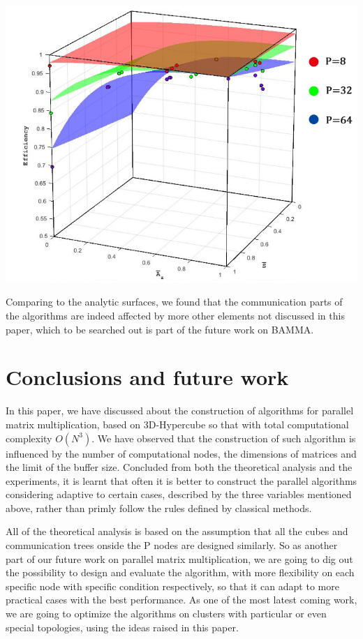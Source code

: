 \documentclass{amsart}
\theoremstyle{definition}
\theoremstyle{remark}
\numberwithin{equation}{section}
\begin{document}
\includegraphics[scale=0.8]{figures/Efficieny.png}

Comparing to the analytic surfaces, we found that the communication parts of the algorithms are indeed affected by more other elements not discussed in this paper, which to be searched out is part of the future work on BAMMA.
\section{Conclusions and future work}
	In this paper, we have discussed about the construction of algorithms for parallel matrix multiplication, based on 3D-Hypercube so that with total computational complexity $O(N^3)$. We have observed that the construction of such algorithm is influenced by the number of computational nodes, the dimensions of matrices and the limit of the buffer size. Concluded from both the theoretical analysis and the experiments, it is learnt that often it is better to construct the parallel algorithms considering adaptive to certain cases, described by the three variables mentioned above, rather than primly follow the rules defined by classical methods.
	
	All of the theoretical analysis is based on the assumption that all the cubes and communication trees onside the P nodes are designed similarly. So as another part of our future work on parallel matrix multiplication, we are going to dig out the possibility to design and evaluate the algorithm, with more flexibility on each specific node with specific condition respectively, so that it can adapt to more practical cases with the best performance. As one of the most latest coming work, we are going to optimize the algorithms on clusters with particular or even special topologies, using the ideas raised in this paper.
	
\end{document}
